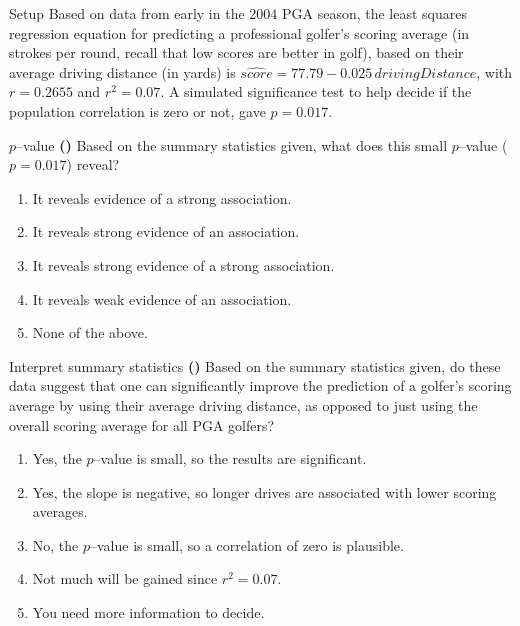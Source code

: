 \documentclass[13pt]{beamer}
\newcounter{count}
\newcommand{\question}{ \textbf{(\decimal{count})} \stepcounter{count}}
\newenvironment{click}{\begin{enumerate}[A]}{\end{enumerate}}
\begin{document}
\begin{frame}{Setup}
%
%
Based on data from early in the 2004 PGA season, the least squares regression equation for predicting a professional golfer's scoring average (in strokes per round, recall that low scores are better in golf), based on their average driving distance (in yards) is $\widehat{score} = 77.79 - 0.025 \, drivingDistance$, with $r = 0.2655$ and $r^2 = 0.07$. A simulated significance test to help decide if the population correlation is zero or not, gave $p = 0.017$.
\end{frame}

\begin{frame}{$p$--value}
\question Based on the summary statistics given, what does this small $p$--value ($p = 0.017$) reveal?
\begin{click}
   \item It reveals evidence of a strong association.
   \item It reveals strong evidence of an association.%
   \item It reveals strong evidence of a strong association.
   \item It reveals weak evidence of an association.
   \item None of the above.
\end{click}
\end{frame}

\begin{frame}{Interpret summary statistics}
\question Based on the summary statistics given, do these data suggest that one can significantly improve the prediction of a golfer's scoring average by using their average driving distance, as opposed to just using the overall scoring average for all PGA golfers?
\begin{click}
   \item Yes, the $p$--value is small, so the results are significant.
   \item Yes, the slope is negative, so longer drives are associated with lower scoring averages.
   \item No, the $p$--value is small, so a correlation of zero is plausible.
   \item Not much will be gained since $r^2 = 0.07$.%
   \item You need more information to decide.
\end{click}
\end{frame}
\end{document}

